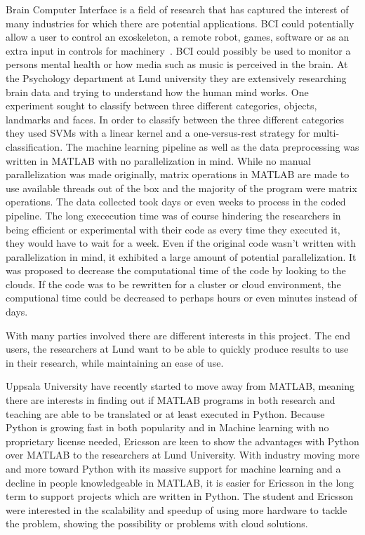 \documentclass[12pt, a4paper]{article}
\begin{document}
Brain Computer Interface is a field of research that has captured the interest of many industries for which there are potential applications.
BCI could potentially allow a user to control an exoskeleton, a remote robot, games, software or as an extra input in controls for machinery~\cite{10.3389/fnins.2010.00198}.
BCI could possibly be used to monitor a persons mental health or how media such as music is perceived in the brain.
At the Psychology department at Lund university they are extensively researching brain data and trying to understand how the human mind works.
One experiment sought to classify between three different categories, objects, landmarks and faces.
In order to classify between the three different categories they used SVMs with a linear kernel and a one-versus-rest strategy for multi-classification.
The machine learning pipeline as well as the data preprocessing was written in MATLAB with no parallelization in mind.
While no manual parallelization was made originally, matrix operations in MATLAB are made to use available threads out of the box and the majority of the program were matrix operations.
The data collected took days or even weeks to process in the coded pipeline.
The long exececution time was of course hindering the researchers in being efficient or experimental with their code as every time they executed it, they would have to wait for a week.
Even if the original code wasn't written with parallelization in mind, it exhibited a large amount of potential parallelization.
It was proposed to decrease the computational time of the code by looking to the clouds.
If the code was to be rewritten for a cluster or cloud environment, the computional time could be decreased to perhaps hours or even minutes instead of days.

With many parties involved there are different interests in this project.
The end users, the researchers at Lund want to be able to quickly produce results to use in their research, while maintaining an ease of use.

Uppsala University have recently started to move away from MATLAB, meaning there are interests in finding out if MATLAB programs in both research and teaching are able to be translated or at least executed in Python.
Because Python is growing fast in both popularity and in Machine learning with no proprietary license needed, Ericsson are keen to show the advantages with Python over MATLAB to the researchers at Lund University.
With industry moving more and more toward Python with its massive support for machine learning and a decline in people knowledgeable in MATLAB, it is easier for Ericsson in the long term to support projects which are written in Python.
The student and Ericsson were interested in the scalability and speedup of using more hardware to tackle the problem, showing the possibility or problems with cloud solutions.
\end{document}

